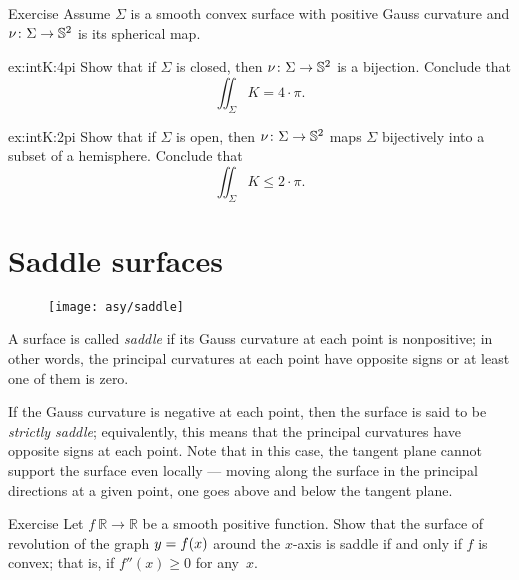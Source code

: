 \begin{thm}{Exercise}\label{ex:intK}
Assume $\Sigma$ is a smooth convex surface with positive Gauss curvature
and $\nu\colon\Sigma\to \mathbb{S}^2$ is its spherical map.

\begin{multicols}{2}

\begin{subthm}{ex:intK:4pi}
Show that if $\Sigma$ is closed, then $\nu\colon\Sigma\to \mathbb{S}^2$ is a bijection.
Conclude that 
\[\iint_\Sigma K=4\cdot\pi.\]
\end{subthm}

\begin{subthm}{ex:intK:2pi}
Show that if $\Sigma$ is open, then $\nu\colon\Sigma\to \mathbb{S}^2$
maps $\Sigma$ bijectively into a subset of a hemisphere.
Conclude that 
\[\iint_\Sigma K\le 2\cdot\pi.\]
\end{subthm}

\end{multicols}

\end{thm}



\section{Saddle surfaces}\label{sec:saddle}

\begin{wrapfigure}{r}{43 mm}
\vskip-8mm
\centering
\texttt{[image: asy/saddle]}
\vskip0mm
\end{wrapfigure}

A surface is called \emph{saddle} if its Gauss curvature at each point is nonpositive;
in other words, the principal curvatures at each point have opposite signs or at least one of them is zero.

If the Gauss curvature is negative at each point,
then the surface is said to be {}\emph{strictly saddle};
equivalently, this means that the principal curvatures have opposite signs at each point.
Note that in this case, the tangent plane cannot support the surface even locally --- moving along the surface in the principal directions at a given point, one goes above and below the tangent plane.  


\begin{thm}{Exercise}\label{ex:convex-revolution}
Let $f\:\mathbb{R}\to\mathbb{R}$ be a smooth positive function.
Show that the surface of revolution of the graph $y\z=f(x)$ around the $x$-axis
 is saddle if and only if $f$ is convex; that is, if $f''(x)\ge0$ for any~$x$.
\end{thm}

